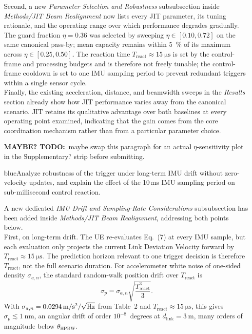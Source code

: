 \documentclass{article}
\newcommand{\blue}[1]{\begin{color}{blue}#1\end{color}}
\newcommand{\todo}[1]{\textcolor{todopurple}{\textbf{MAYBE? TODO:}~#1}}
\begin{document}
\noindent Second, a new \emph{Parameter Selection and Robustness} subsubsection inside \emph{Methods/JIT Beam Realignment} now lists every JIT parameter, its tuning rationale, and the operating range over which performance degrades gradually. The guard fraction $\eta = 0.36$ was selected by sweeping $\eta \in [0.10, 0.72]$ on the same canonical pass-by; mean capacity remains within \SI{5}{\percent} of its maximum across $\eta \in [0.25, 0.50]$. The reaction time $T_{\text{react}} \approx \SI{15}{\micro\second}$ is set by the control-frame and processing budgets and is therefore not freely tunable; the control-frame cooldown is set to one IMU sampling period to prevent redundant triggers within a single sensor cycle.\\

\noindent Finally, the existing acceleration, distance, and beamwidth sweeps in the \emph{Results} section already show how JIT performance varies away from the canonical scenario. JIT retains its qualitative advantage over both baselines at every operating point examined, indicating that the gain comes from the core coordination mechanism rather than from a particular parameter choice.

\todo{maybe swap this paragraph for an actual $\eta$-sensitivity plot in the Supplementary? strip before submitting.}

\begin{tcbremark}
{\selectfont
\blue{Analyze robustness of the trigger under long-term IMU drift without zero-velocity updates, and explain the effect of the 10\,ms IMU sampling period on sub-millisecond control reaction.}
}
\end{tcbremark}

\noindent A new dedicated \emph{IMU Drift and Sampling-Rate Considerations} subsubsection has been added inside \emph{Methods/JIT Beam Realignment}, addressing both points below.\\

\noindent First, on long-term drift. The UE re-evaluates Eq.~(7) at every IMU sample, but each evaluation only projects the current Link Deviation Velocity forward by $T_{\text{react}} \approx \SI{15}{\micro\second}$. The prediction horizon relevant to one trigger decision is therefore $T_{\text{react}}$, not the full scenario duration. For accelerometer white noise of one-sided density $\sigma_{a,n}$, the standard random-walk position drift over $T_{\text{react}}$ is
\begin{equation}
    \sigma_p = \sigma_{a,n}\sqrt{\frac{T_{\text{react}}^{3}}{3}}.
\end{equation}
With $\sigma_{a,n} = \SI{0.0294}{\meter\per\second\squared\per\sqrt{\hertz}}$ from Table~2 and $T_{\text{react}} \approx \SI{15}{\micro\second}$, this gives $\sigma_{p} \lesssim \SI{1}{\nano\meter}$, an angular drift of order $10^{-8}$~degrees at $d_{\text{link}} = \SI{3}{\meter}$, many orders of magnitude below $\theta_{\text{HPBW}}$.\\
\end{document}
